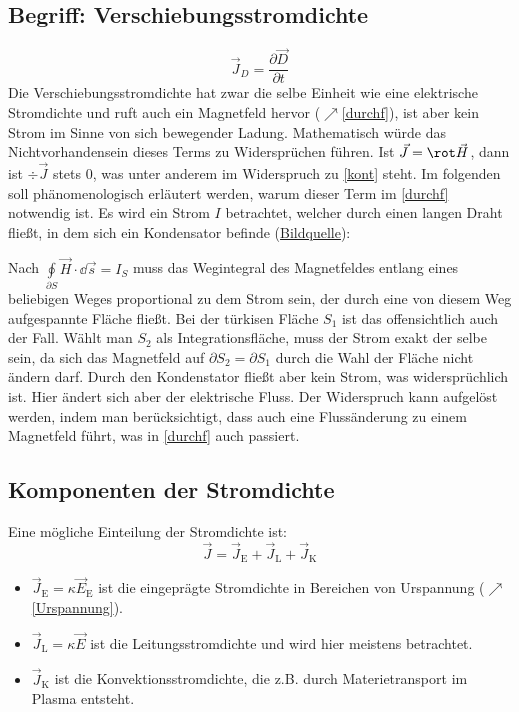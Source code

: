    \subsection{Begriff: Verschiebungsstromdichte}
  \begin{equation}
  	\vec{J}_D=\frac{\partial\vec{D}}{\partial t}
  \end{equation}
  Die Verschiebungsstromdichte hat zwar die selbe Einheit wie eine elektrische Stromdichte und ruft auch ein Magnetfeld hervor ($\nearrow$\ref{durchf}), ist aber kein Strom im Sinne von sich bewegender Ladung. Mathematisch würde das Nichtvorhandensein dieses Terms zu Widersprüchen führen. Ist $\vec{J}=\rot\vec{H}$, dann ist $\div\vec{J}$ stets 0, was unter anderem im Widerspruch zu \ref{kont} steht. Im folgenden soll phänomenologisch erläutert werden, warum dieser Term im \ref{durchf} notwendig ist. Es wird ein Strom $I$ betrachtet, welcher durch einen langen Draht fließt, in dem sich ein Kondensator befinde (\href{https://commons.wikimedia.org/wiki/File:Displacement_current_in_capacitor.svg}{Bildquelle}):  \begin{center}
  	\resizebox{!}{.6\textwidth}{}
  \end{center}
  Nach $\oint\limits_{\partial S}\vec{H}\cdot \dd\vec{s}= I_{S}$ muss das Wegintegral des Magnetfeldes entlang eines beliebigen Weges proportional zu dem Strom sein, der durch eine von diesem Weg aufgespannte Fläche fließt. Bei der türkisen Fläche $S_1$ ist das offensichtlich auch der Fall. Wählt man $S_2$ als Integrationsfläche, muss der Strom exakt der selbe sein, da sich das Magnetfeld auf $\partial S_2=\partial S_1$ durch die Wahl der Fläche nicht ändern darf. Durch den Kondenstator fließt aber kein Strom, was widersprüchlich ist. Hier ändert sich aber der elektrische Fluss. Der Widerspruch kann aufgelöst werden, indem man berücksichtigt, dass auch eine Flussänderung zu einem Magnetfeld führt, was in \ref{durchf} auch passiert.
  \subsection{Komponenten der Stromdichte}
  Eine mögliche Einteilung der Stromdichte ist:
  \begin{equation}
  	\vec{J}=\vec{J}_\mathrm{E}+\vec{J}_\mathrm{L}+\vec{J}_\mathrm{K}
  \end{equation}
  \begin{itemize}
  	\item $\vec{J}_\mathrm{E} = \kappa \vec{E}_\mathrm{E}$ ist die eingeprägte Stromdichte in Bereichen von Urspannung ($\nearrow$\ref{Urspannung}).
  	\item $\vec{J}_\mathrm{L}=\kappa\vec{E}$ ist die Leitungsstromdichte und wird hier meistens betrachtet.
  	\item $\vec{J}_\mathrm{K}$ ist die Konvektionsstromdichte, die z.B. durch Materietransport im Plasma entsteht.
  \end{itemize}
